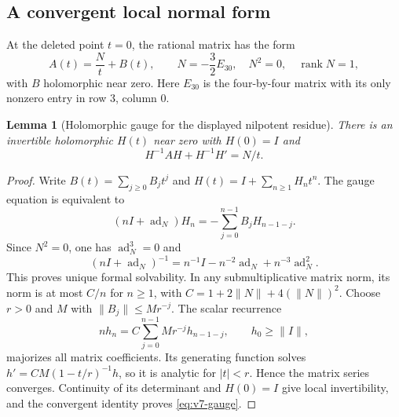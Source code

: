 \documentclass[11pt]{article}
\newtheorem{lemma}[lemma]{Lemma}
\theoremstyle{definition}
\theoremstyle{remark}
\newcommand{\rank}{\operatorname{rank}}
\newcommand{\norm}[1]{\lVert#1\rVert}
\begin{document}
\subsection{A convergent local normal form}
At the deleted point $t=0$, the rational matrix has the form
\begin{equation}
 A(t)=\frac Nt+B(t),\qquad
 \boxed{N=-\frac32 E_{30},\quad N^2=0,\quad\rank N=1,}
 \label{eq:v7-residue}
\end{equation}
with $B$ holomorphic near zero. Here $E_{30}$ is the four-by-four matrix
with its only nonzero entry in row $3$, column $0$.

\begin{lemma}[Holomorphic gauge for the displayed nilpotent residue]
\label{lem:v7-local-gauge}
There is an invertible holomorphic $H(t)$ near zero with $H(0)=I$ and
\begin{equation}
 H^{-1}AH+H^{-1}H'=N/t.
 \label{eq:v7-gauge}
\end{equation}
\end{lemma}
\begin{proof}
Write $B(t)=\sum_{j\ge0}B_jt^j$ and $H(t)=I+\sum_{n\ge1}H_nt^n$.
The gauge equation is equivalent to
\begin{equation}
 (nI+\operatorname{ad}_N)H_n
   =-\sum_{j=0}^{n-1}B_jH_{n-1-j}.
 \label{eq:v7-gauge-recurrence}
\end{equation}
Since $N^2=0$, one has $\operatorname{ad}_N^3=0$ and
\[
 (nI+\operatorname{ad}_N)^{-1}
 =n^{-1}I-n^{-2}\operatorname{ad}_N+n^{-3}\operatorname{ad}_N^2.
\]
This proves unique formal solvability. In any submultiplicative matrix norm,
its norm is at most $C/n$ for $n\ge1$, with
$C=1+2\norm N+4(\norm N)^2$.
Choose $r>0$ and $M$ with $\norm{B_j}\le Mr^{-j}$. The scalar recurrence
\[
 nh_n=C\sum_{j=0}^{n-1}Mr^{-j}h_{n-1-j},\qquad h_0\ge\norm I,
\]
majorizes all matrix coefficients. Its generating function solves
$h'=CM(1-t/r)^{-1}h$, so it is analytic for $|t|<r$. Hence the matrix
series converges. Continuity of its determinant and $H(0)=I$ give local
invertibility, and the convergent identity proves \eqref{eq:v7-gauge}.
\end{proof}
\end{document}
